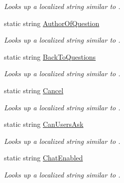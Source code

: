 \begin{DoxyCompactItemize}
\begin{DoxyCompactList}\small\item\em Looks up a localized string similar to . \end{DoxyCompactList}\item 
static string \hyperlink{class_wis_r_1_1_app___resources_1_1_resource_a17797cf5a9a93888aba1591bf0fc0d26}{Author\+Of\+Question}
\begin{DoxyCompactList}\small\item\em Looks up a localized string similar to . \end{DoxyCompactList}\item 
static string \hyperlink{class_wis_r_1_1_app___resources_1_1_resource_a976b25d7e04e7cb755a4c744ba196679}{Back\+To\+Questions}
\begin{DoxyCompactList}\small\item\em Looks up a localized string similar to . \end{DoxyCompactList}\item 
static string \hyperlink{class_wis_r_1_1_app___resources_1_1_resource_ad840677aeb5f66405a6c007d12d0aaf1}{Cancel}
\begin{DoxyCompactList}\small\item\em Looks up a localized string similar to . \end{DoxyCompactList}\item 
static string \hyperlink{class_wis_r_1_1_app___resources_1_1_resource_aa809e96b26c2a8f0db0985a51d1fcb7a}{Can\+Users\+Ask}
\begin{DoxyCompactList}\small\item\em Looks up a localized string similar to . \end{DoxyCompactList}\item 
static string \hyperlink{class_wis_r_1_1_app___resources_1_1_resource_a58688d3d08c8eb997cd135085769321a}{Chat\+Enabled}
\begin{DoxyCompactList}\small\item\em Looks up a localized string similar to . \end{DoxyCompactList}\item 

\end{DoxyCompactItemize}
